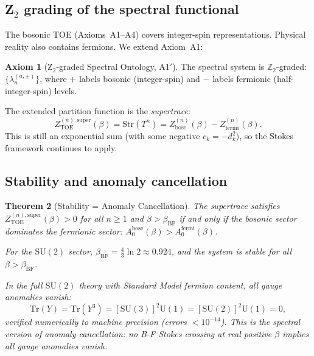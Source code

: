 \documentclass[12pt]{article}
\newtheorem{theorem}{Theorem}[section]
\theoremstyle{definition}
\newtheorem{axiom}[theorem]{Axiom}
\theoremstyle{remark}
\newcommand{\SU}{\mathrm{SU}}
\newcommand{\U}{\mathrm{U}}
\newcommand{\Tr}{\mathrm{Tr}}
\newcommand{\TOE}{\mathrm{TOE}}
\begin{document}
\subsection{Z\texorpdfstring{$_2$}{2} grading of the spectral functional}

The bosonic TOE (Axioms~A1--A4) covers integer-spin representations.
Physical reality also contains fermions.  We extend Axiom~A1:

\begin{axiom}[Z$_2$-graded Spectral Ontology, A1$'$]
The spectral system is $\mathbb{Z}_2$-graded:
$\bigl\{\lambda_n^{(a,\pm)}\bigr\}$, where $+$ labels bosonic
(integer-spin) and $-$ labels fermionic (half-integer-spin) levels.
\end{axiom}

The extended partition function is the \emph{supertrace}:
\begin{equation}\label{eq:Zsuper}
Z_\TOE^{(n),\mathrm{super}}(\beta)
= \mathrm{Str}(T^n)
= Z_\mathrm{bose}^{(n)}(\beta) - Z_\mathrm{fermi}^{(n)}(\beta).
\end{equation}
This is still an exponential sum (with some negative $c_k = -d_k^2$),
so the Stokes framework continues to apply.

\subsection{Stability and anomaly cancellation}

\begin{theorem}[Stability = Anomaly Cancellation]\label{thm:anomaly}
The supertrace satisfies $Z_\TOE^{(n),\mathrm{super}}(\beta) > 0$ for all
$n \geq 1$ and $\beta > \beta_\mathrm{BF}$ if and only if the bosonic
sector dominates the fermionic sector: $A_0^\mathrm{bose}(\beta) > A_0^\mathrm{fermi}(\beta)$.

For the $\SU(2)$ sector, $\beta_\mathrm{BF} = \frac{4}{3}\ln 2 \approx 0.924$,
and the system is stable for all $\beta > \beta_\mathrm{BF}$.

In the full $\SU(2)$ theory with Standard Model fermion content, all
gauge anomalies vanish:
\begin{equation}\label{eq:anomaly}
\Tr(Y) = \Tr(Y^3) = [\SU(3)]^2\U(1) = [\SU(2)]^2\U(1) = 0,
\end{equation}
verified numerically to machine precision (errors $< 10^{-14}$).
This is the spectral version of anomaly cancellation:
no B-F Stokes crossing at real positive $\beta$ implies all gauge
anomalies vanish.
\end{theorem}
\end{document}

